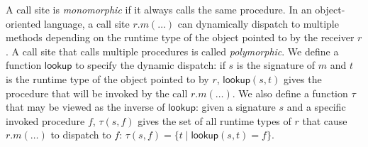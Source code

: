 
A call site is \textit{monomorphic} if it always calls the same procedure. In an object-oriented language, 
a call site $r.m(\ldots)$ can dynamically dispatch to multiple methods depending on the runtime
type of the object pointed to by the receiver $r$.
A call site that calls multiple procedures is called
\textit{polymorphic}.
We define a function $\textsf{lookup}$ to specify the dynamic dispatch: 
if $s$ is the signature of $m$ and $t$ is the runtime type of the object
pointed to by $r$, $\textsf{lookup}(s,t)$ gives the procedure that will
be invoked by the call $r.m(\ldots)$. We also define a function $\tau$
that may be viewed as the inverse
of $\textsf{lookup}$: given a signature $s$ and a specific invoked procedure
$f$, $\tau(s,f)$ gives the set of all runtime types of $r$ that cause $r.m(\ldots)$
to dispatch to $f$: $\tau(s,f) = \{t\mid \textsf{lookup}(s,t)=f\}$.


